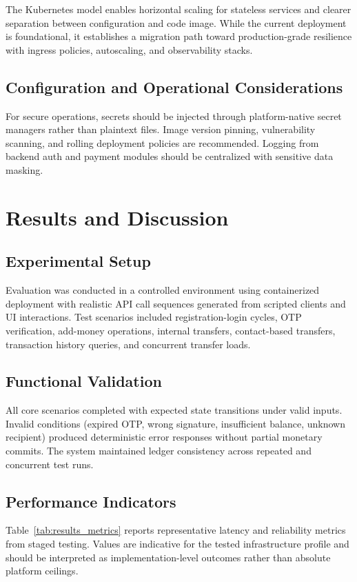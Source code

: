 \documentclass[conference]{IEEEtran}
\begin{document}
The Kubernetes model enables horizontal scaling for stateless services and clearer separation between configuration and code image. While the current deployment is foundational, it establishes a migration path toward production-grade resilience with ingress policies, autoscaling, and observability stacks.

\subsection{Configuration and Operational Considerations}
For secure operations, secrets should be injected through platform-native secret managers rather than plaintext files. Image version pinning, vulnerability scanning, and rolling deployment policies are recommended. Logging from backend auth and payment modules should be centralized with sensitive data masking.

\section{Results and Discussion}
\subsection{Experimental Setup}
Evaluation was conducted in a controlled environment using containerized deployment with realistic API call sequences generated from scripted clients and UI interactions. Test scenarios included registration-login cycles, OTP verification, add-money operations, internal transfers, contact-based transfers, transaction history queries, and concurrent transfer loads.

\subsection{Functional Validation}
All core scenarios completed with expected state transitions under valid inputs. Invalid conditions (expired OTP, wrong signature, insufficient balance, unknown recipient) produced deterministic error responses without partial monetary commits. The system maintained ledger consistency across repeated and concurrent test runs.

\subsection{Performance Indicators}
Table~\ref{tab:results_metrics} reports representative latency and reliability metrics from staged testing. Values are indicative for the tested infrastructure profile and should be interpreted as implementation-level outcomes rather than absolute platform ceilings.
\end{document}
